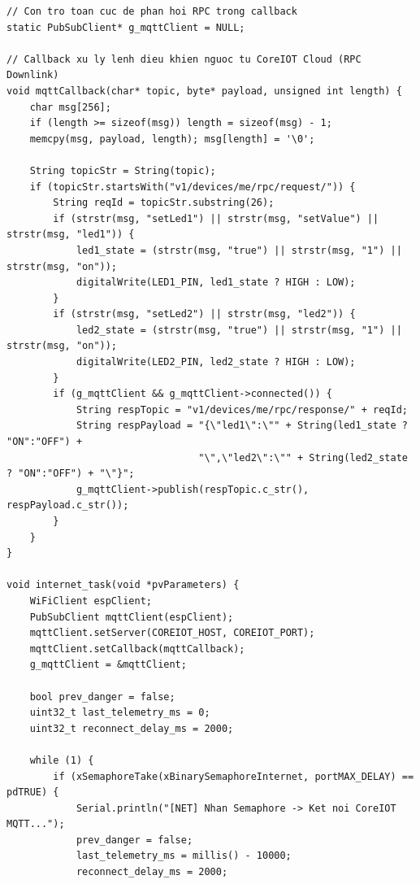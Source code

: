 \begin{lstlisting}[caption={Tác vụ internet\_task xử lý MQTT Telemetry, Báo động và RPC Điều khiển ngược}]
// Con tro toan cuc de phan hoi RPC trong callback
static PubSubClient* g_mqttClient = NULL;

// Callback xu ly lenh dieu khien nguoc tu CoreIOT Cloud (RPC Downlink)
void mqttCallback(char* topic, byte* payload, unsigned int length) {
    char msg[256];
    if (length >= sizeof(msg)) length = sizeof(msg) - 1;
    memcpy(msg, payload, length); msg[length] = '\0';

    String topicStr = String(topic);
    if (topicStr.startsWith("v1/devices/me/rpc/request/")) {
        String reqId = topicStr.substring(26);
        if (strstr(msg, "setLed1") || strstr(msg, "setValue") || strstr(msg, "led1")) {
            led1_state = (strstr(msg, "true") || strstr(msg, "1") || strstr(msg, "on"));
            digitalWrite(LED1_PIN, led1_state ? HIGH : LOW);
        }
        if (strstr(msg, "setLed2") || strstr(msg, "led2")) {
            led2_state = (strstr(msg, "true") || strstr(msg, "1") || strstr(msg, "on"));
            digitalWrite(LED2_PIN, led2_state ? HIGH : LOW);
        }
        if (g_mqttClient && g_mqttClient->connected()) {
            String respTopic = "v1/devices/me/rpc/response/" + reqId;
            String respPayload = "{\"led1\":\"" + String(led1_state ? "ON":"OFF") + 
                                 "\",\"led2\":\"" + String(led2_state ? "ON":"OFF") + "\"}";
            g_mqttClient->publish(respTopic.c_str(), respPayload.c_str());
        }
    }
}

void internet_task(void *pvParameters) {
    WiFiClient espClient;
    PubSubClient mqttClient(espClient);
    mqttClient.setServer(COREIOT_HOST, COREIOT_PORT);
    mqttClient.setCallback(mqttCallback);
    g_mqttClient = &mqttClient;

    bool prev_danger = false;
    uint32_t last_telemetry_ms = 0;
    uint32_t reconnect_delay_ms = 2000;

    while (1) {
        if (xSemaphoreTake(xBinarySemaphoreInternet, portMAX_DELAY) == pdTRUE) {
            Serial.println("[NET] Nhan Semaphore -> Ket noi CoreIOT MQTT...");
            prev_danger = false;
            last_telemetry_ms = millis() - 10000;
            reconnect_delay_ms = 2000;


\end{lstlisting}
